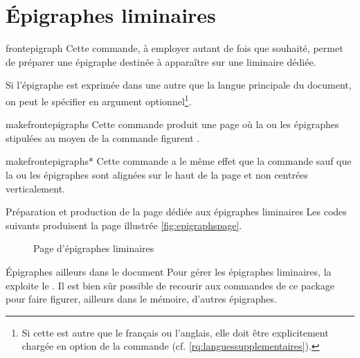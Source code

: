 \section{Épigraphes liminaires}

\begin{docCommand}{frontepigraph}{}
  Cette commande, à employer autant de fois que
  souhaité\hauteurpage{}, permet de préparer une épigraphe destinée à
  apparaître sur une \gls{liminaire} dédiée.

  Si l'épigraphe est exprimée dans une   autre que la langue principale du document, on peut le
  spécifier en argument optionnel\footnote{Si cette  est autre que
    le français ou l'anglais, elle doit être explicitement chargée en option de
    la commande  (cf.
    \vref{rq:languessupplementaires}).}.
\end{docCommand}

\begin{docCommand}{makefrontepigraphs}{}
  Cette commande produit une page où la ou les épigraphes stipulées au moyen de
  la commande  figurent .
\end{docCommand}
%
\begin{docCommand}{makefrontepigraphs*}{}
  Cette commande a le même effet que la commande
   sauf que la ou les épigraphes sont alignées sur
  le haut de la page et non centrées verticalement.
\end{docCommand}

\begin{dbexample}{Préparation et production de la page dédiée aux épigraphes
    liminaires}{}
  \NoAutoSpacing%
  Les codes suivants produisent la page illustrée \vref{fig:epigraphspage}.
\end{dbexample}

\begin{figure}[htbp]
  \centering {}
  \caption{Page d'épigraphes liminaires}
  \label{fig:epigraphspage}
\end{figure}

\begin{dbremark}{Épigraphes ailleurs dans le document}{}
  Pour gérer les épigraphes liminaires, la \yatcl{} exploite le
   . Il est bien sûr
  possible de recourir aux commandes de ce package pour faire figurer, ailleurs
  dans le mémoire, d'autres épigraphes.
\end{dbremark}

